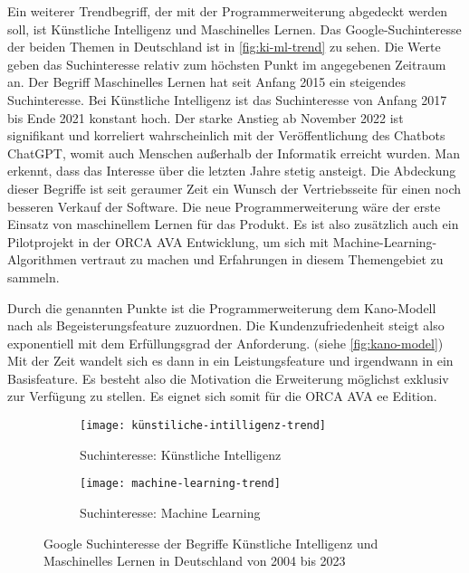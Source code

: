 Ein weiterer Trendbegriff, der mit der Programmerweiterung abgedeckt werden soll, ist \glqq Künstliche Intelligenz\grqq{} und \glqq Maschinelles Lernen\grqq{}. Das Google-Suchinteresse der beiden Themen in Deutschland ist in \autoref{fig:ki-ml-trend} zu sehen. Die Werte geben das Suchinteresse relativ zum höchsten Punkt im angegebenen Zeitraum an. Der Begriff \glqq Maschinelles Lernen\grqq{} hat seit Anfang 2015 ein steigendes Suchinteresse. Bei \glqq Künstliche Intelligenz\grqq{} ist das Suchinteresse von Anfang 2017 bis Ende 2021 konstant hoch. Der starke Anstieg ab November 2022 ist signifikant und korreliert wahrscheinlich mit der Veröffentlichung des Chatbots ChatGPT, womit auch Menschen außerhalb der Informatik erreicht wurden. Man erkennt, dass das Interesse über die letzten Jahre stetig ansteigt. Die Abdeckung dieser Begriffe ist seit geraumer Zeit ein Wunsch der Vertriebsseite für einen noch besseren Verkauf der Software. Die neue Programmerweiterung wäre der erste Einsatz von maschinellem Lernen für das Produkt. Es ist also zusätzlich auch ein Pilotprojekt in der ORCA AVA Entwicklung, um sich mit Machine-Learning-Algorithmen vertraut zu machen und Erfahrungen in diesem Themengebiet zu sammeln. 

Durch die genannten Punkte ist die Programmerweiterung dem Kano-Modell nach als Begeisterungsfeature zuzuordnen. Die Kundenzufriedenheit steigt also exponentiell mit dem Erfüllungsgrad der Anforderung. (siehe \autoref{fig:kano-model}) Mit der Zeit wandelt sich es dann in ein Leistungsfeature und irgendwann in ein Basisfeature. \citep[vgl.][p.~3-4]{Hölzing_2008} Es besteht also die Motivation die Erweiterung möglichst exklusiv zur Verfügung zu stellen. Es eignet sich somit für die ORCA AVA \ac{ee} Edition.

\begin{figure}[h]
	\centering
	
	\begin{subfigure}{0.99\textwidth}
		\centering
	\texttt{[image: künstiliche-intilligenz-trend]}
		\caption{Suchinteresse: Künstliche Intelligenz}
		\label{FIG:ki-trend}
	\end{subfigure}
	\hspace{1cm}
	\begin{subfigure}{0.99\textwidth}
		\centering
	\texttt{[image: machine-learning-trend]}
	\caption{Suchinteresse: Machine Learning}
	\label{FIG:ml-trend}
	\end{subfigure}
	
	\caption[Suchinteresse von \glqq Künstliche Intelligenz\grqq{} und \glqq Maschinelles Lernen\grqq{}]{Google Suchinteresse der Begriffe \glqq Künstliche Intelligenz\grqq{} und \glqq Maschinelles Lernen\grqq{} in Deutschland von 2004 bis 2023}
	\label{fig:ki-ml-trend}
\end{figure}

